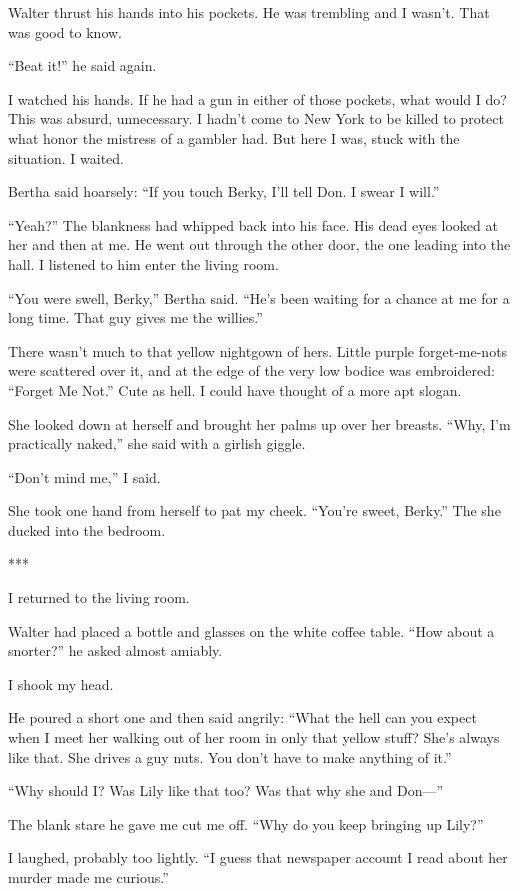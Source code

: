 {Walter thrust his hands into his pockets. He was trembling and I wasn’t. That was good to know.

“Beat it!” he said again.

I watched his hands. If he had a gun in either of those pockets, what would I do? This was absurd, unnecessary. I hadn’t come to New York to be killed to protect what honor the mistress of a gambler had. But here I was, stuck with the situation. I waited.

Bertha said hoarsely: “If you touch Berky, I’ll tell Don. I swear I will.”

“Yeah?” The blankness had whipped back into his face. His dead eyes looked at her and then at me. He went out through the other door, the one leading into the hall. I listened to him enter the living room.

“You were swell, Berky,” Bertha said. “He’s been waiting for a chance at me for a long time. That guy gives me the willies.”

There wasn’t much to that yellow nightgown of hers. Little purple forget-me-nots were scattered over it, and at the edge of the very low bodice was embroidered: “Forget Me Not.” Cute as hell. I could have thought of a more apt slogan.

She looked down at herself and brought her palms up over her breasts. “Why, I’m practically naked,” she said with a girlish giggle.

“Don’t mind me,” I said.

She took one hand from herself to pat my cheek. “You’re sweet, Berky.” The she ducked into the bedroom.

***

I returned to the living room.

Walter had placed a bottle and glasses on the white coffee table. “How about a snorter?” he asked almost amiably.

I shook my head.

He poured a short one and then said angrily: “What the hell can you expect when I meet her walking out of her room in only that yellow stuff? She’s always like that. She drives a guy nuts. You don’t have to make anything of it.”

“Why should I? Was Lily like that too? Was that why she and Don—”

The blank stare he gave me cut me off. “Why do you keep bringing up Lily?”

I laughed, probably too lightly. “I guess that newspaper account I read about her murder made me curious.”

}
